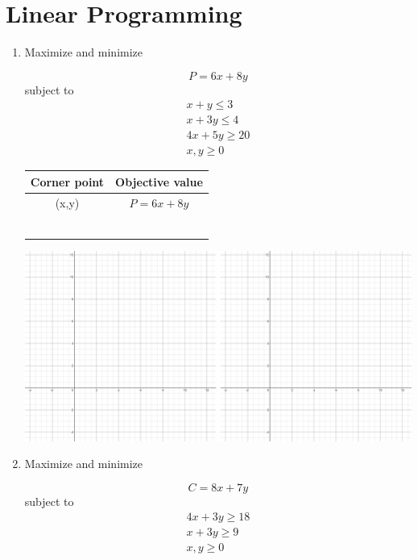 \documentclass[14pt]{extarticle}
\begin{document}
\section{Linear Programming}
\begin{enumerate}
	\item Maximize and minimize
	\begin{multicols}{2}
		$$P = 6x +8y$$
		subject to 
		\begin{align*}
			x+y \leq 3 \\
			x+3y \leq 4 \\
			4x+5y \geq 20 \\
			x,y \geq 0
		\end{align*}
	
		\begin{tabular}{|c|c|}
			\hline
			Corner point & Objective value \\
			\hline
			(x,y) & $P=6x+8y$ \\
			\hline
			 &  \\
			\hline
			& \\
			\hline
			& \\
			\hline
			& \\
			\hline
			& \\
			\hline
			& \\
			\hline
		\end{tabular}
	\end{multicols}
	
	\hspace{-1.5cm}\includegraphics[width=1.1\linewidth]{empty-graphax2}
	
	
	\item Maximize and minimize
	\begin{multicols}{2}
		$$C = 8x +7y$$
		subject to 
		\begin{align*}
			4x+3y \geq 18 \\
			x+3y \geq 9 \\
			x,y \geq 0
		\end{align*}
	

\end{multicols}
\end{enumerate}
\end{document}
